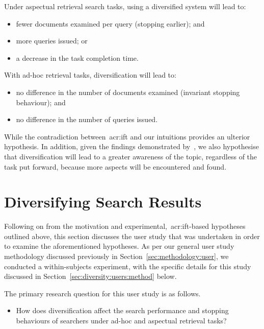 Under aspectual retrieval search tasks, using a diversified system will lead to:
\begin{itemize}
    \item{ fewer documents examined per query (stopping earlier); and}
    \item{ more queries issued; or}
    \item{ a decrease in the task completion time.}
\end{itemize}

With ad-hoc retrieval tasks, diversification will lead to:
\begin{itemize}
    \item{ no difference in the number of documents examined (invariant stopping behaviour); and}
    \item{ no difference in the number of queries issued.}
\end{itemize}

While the contradiction between~\gls{acr:ift} and our intuitions provides an ulterior hypothesis. In addition, given the findings demonstrated by~\cite{syed2017sal}, we also hypothesise that diversification will lead to a greater awareness of the topic, regardless of the task put forward, because more aspects will be encountered and found.

\section{Diversifying Search Results}\label{sec:diversity:users}
Following on from the motivation and experimental,~\gls{acr:ift}-based hypotheses outlined above, this section discusses the user study that was undertaken in order to examine the aforementioned hypotheses. As per our general user study methodology discussed previously in Section~\ref{sec:methodology:user}, we conducted a within-subjects experiment, with the specific details for this study discussed in Section~\ref{sec:diversity:users:method} below.

The primary research question for this user study is as follows.

\begin{itemize}
    \item{ How does diversification affect the search performance and stopping behaviours of searchers under ad-hoc and aspectual retrieval tasks?}
\end{itemize}

